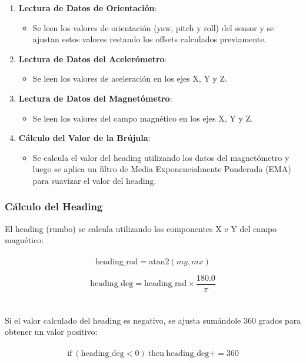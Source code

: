         \begin{enumerate}
            \item \textbf{Lectura de Datos de Orientación}:
            \begin{itemize}
                \item Se leen los valores de orientación (yaw, pitch y roll) del sensor y se ajustan estos valores restando los offsets calculados previamente.
            \end{itemize}

            \item \textbf{Lectura de Datos del Acelerómetro}:
            \begin{itemize}
                \item Se leen los valores de aceleración en los ejes X, Y y Z.
            \end{itemize}

            \item \textbf{Lectura de Datos del Magnetómetro}:
            \begin{itemize}
                \item Se leen los valores del campo magnético en los ejes X, Y y Z.
            \end{itemize}

            \item \textbf{Cálculo del Valor de la Brújula}:
            \begin{itemize}
                \item Se calcula el valor del heading utilizando los datos del magnetómetro y luego se aplica un filtro de Media Exponencialmente Ponderada (EMA) para suavizar el valor del heading.
            \end{itemize}
        \end{enumerate}



    \subsubsection{Cálculo del Heading}

        El heading (rumbo) se calcula utilizando los componentes X e Y del campo magnético:
        \\ \\
        \[
        \text{heading\_rad} = \text{atan2}(my, mx)
        \]

        \[
        \text{heading\_deg} = \text{heading\_rad} \times \frac{180.0}{\pi}
        \]
        \\ \\
        Si el valor calculado del heading es negativo, se ajusta sumándole 360 grados para obtener un valor positivo:
        \\ \\
        \[
        \text{if} \ (\text{heading\_deg} < 0) \ \text{then} \ \text{heading\_deg} += 360
        \]

